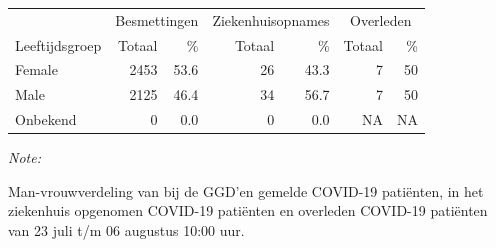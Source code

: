 \documentclass[
  english,
  man,floatsintext]{apa6}
\begin{document}
\begin{table}[H]
\centering\begingroup\fontsize{11}{13}\selectfont

\begin{threeparttable}
\begin{tabular}{lrrrrrr}
\toprule
\multicolumn{1}{c}{ } & \multicolumn{2}{c}{Besmettingen} & \multicolumn{2}{c}{Ziekenhuisopnames} & \multicolumn{2}{c}{Overleden} \\
\cmidrule(l{3pt}r{3pt}){2-3} \cmidrule(l{3pt}r{3pt}){4-5} \cmidrule(l{3pt}r{3pt}){6-7}
Leeftijdsgroep & Totaal & \% & Totaal & \% & Totaal & \%\\
\midrule
Female & 2453 & 53.6 & 26 & 43.3 & 7 & 50\\
Male & 2125 & 46.4 & 34 & 56.7 & 7 & 50\\
Onbekend & 0 & 0.0 & 0 & 0.0 & NA & NA\\
\bottomrule
\end{tabular}
\begin{tablenotes}
\item \textit{Note: } 
\item Man-vrouwverdeling van bij de GGD’en gemelde COVID-19 patiënten, in het ziekenhuis opgenomen COVID-19 patiënten en overleden COVID-19 patiënten van 23 juli t/m 06 augustus 10:00 uur.
\end{tablenotes}
\end{threeparttable}
\endgroup{}
\end{table}
\newpage
\end{document}
